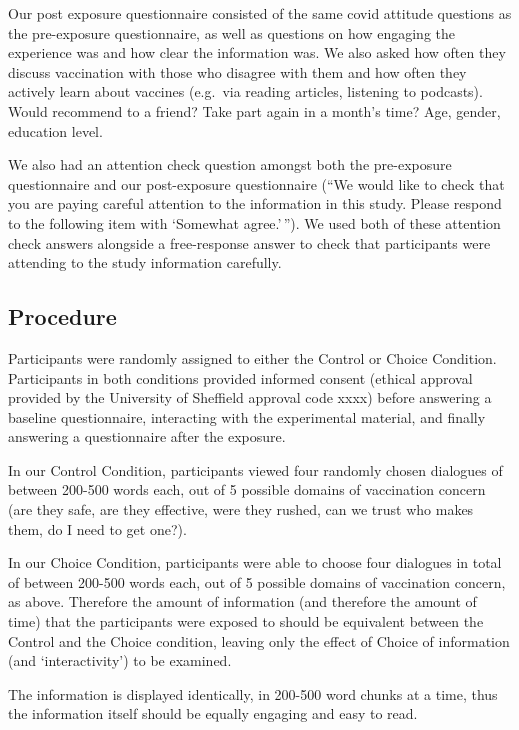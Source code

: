 \documentclass[
  english,
  ,jou,floatsintext]{apa6}
\begin{document}
Our post exposure questionnaire consisted of the same covid attitude questions as the pre-exposure questionnaire, as well as questions on how engaging the experience was and how clear the information was. We also asked how often they discuss vaccination with those who disagree with them and how often they actively learn about vaccines (e.g.~via reading articles, listening to podcasts). Would recommend to a friend? Take part again in a month's time? Age, gender, education level.

We also had an attention check question amongst both the pre-exposure questionnaire and our post-exposure questionnaire (``We would like to check that you are paying careful attention to the information in this study. Please respond to the following item with `Somewhat agree.'\,''). We used both of these attention check answers alongside a free-response answer to check that participants were attending to the study information carefully.

\hypertarget{procedure}{%
\subsection{Procedure}\label{procedure}}

Participants were randomly assigned to either the Control or Choice Condition. Participants in both conditions provided informed consent (ethical approval provided by the University of Sheffield approval code xxxx) before answering a baseline questionnaire, interacting with the experimental material, and finally answering a questionnaire after the exposure.

In our Control Condition, participants viewed four randomly chosen dialogues of between 200-500 words each, out of 5 possible domains of vaccination concern (are they safe, are they effective, were they rushed, can we trust who makes them, do I need to get one?).

In our Choice Condition, participants were able to choose four dialogues in total of between 200-500 words each, out of 5 possible domains of vaccination concern, as above. Therefore the amount of information (and therefore the amount of time) that the participants were exposed to should be equivalent between the Control and the Choice condition, leaving only the effect of Choice of information (and `interactivity') to be examined.

The information is displayed identically, in 200-500 word chunks at a time, thus the information itself should be equally engaging and easy to read.
\end{document}
